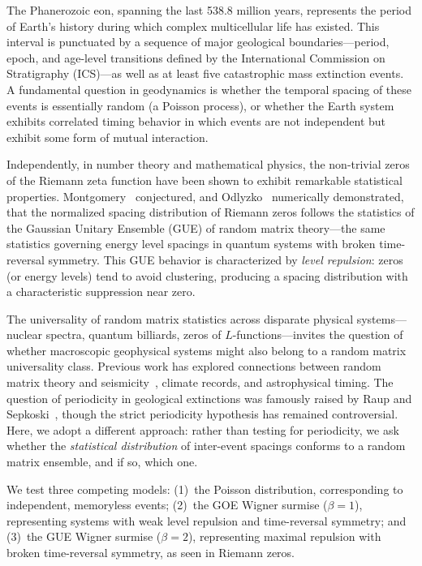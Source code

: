 \documentclass[12pt,a4paper]{article}
\begin{document}
The Phanerozoic eon, spanning the last 538.8 million years, represents the period of Earth's history during which complex multicellular life has existed. This interval is punctuated by a sequence of major geological boundaries---period, epoch, and age-level transitions defined by the International Commission on Stratigraphy (ICS)---as well as at least five catastrophic mass extinction events. A fundamental question in geodynamics is whether the temporal spacing of these events is essentially random (a Poisson process), or whether the Earth system exhibits correlated timing behavior in which events are not independent but exhibit some form of mutual interaction.

Independently, in number theory and mathematical physics, the non-trivial zeros of the Riemann zeta function have been shown to exhibit remarkable statistical properties. Montgomery~\citep{montgomery1973} conjectured, and Odlyzko~\citep{odlyzko1987} numerically demonstrated, that the normalized spacing distribution of Riemann zeros follows the statistics of the Gaussian Unitary Ensemble (GUE) of random matrix theory---the same statistics governing energy level spacings in quantum systems with broken time-reversal symmetry. This GUE behavior is characterized by \emph{level repulsion}: zeros (or energy levels) tend to avoid clustering, producing a spacing distribution with a characteristic suppression near zero.

The universality of random matrix statistics across disparate physical systems---nuclear spectra, quantum billiards, zeros of $L$-functions---invites the question of whether macroscopic geophysical systems might also belong to a random matrix universality class. Previous work has explored connections between random matrix theory and seismicity~\citep{telesca2011}, climate records, and astrophysical timing. The question of periodicity in geological extinctions was famously raised by Raup and Sepkoski~\citep{raup1984}, though the strict periodicity hypothesis has remained controversial. Here, we adopt a different approach: rather than testing for periodicity, we ask whether the \emph{statistical distribution} of inter-event spacings conforms to a random matrix ensemble, and if so, which one.

We test three competing models: (1)~the Poisson distribution, corresponding to independent, memoryless events; (2)~the GOE Wigner surmise ($\beta = 1$), representing systems with weak level repulsion and time-reversal symmetry; and (3)~the GUE Wigner surmise ($\beta = 2$), representing maximal repulsion with broken time-reversal symmetry, as seen in Riemann zeros.
\end{document}
